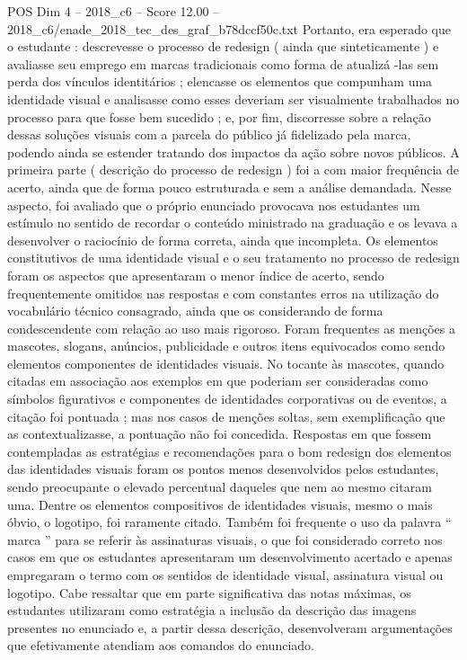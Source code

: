 \begin{textsample}{POS Dim 4 – 2018\_c6 – Score 12.00 – 2018\_c6/enade\_2018\_tec\_des\_graf\_b78dccf50c.txt}
Portanto, era esperado que o estudante : descrevesse o processo de redesign ( ainda que sinteticamente ) e avaliasse seu emprego em marcas tradicionais como forma de atualizá -las sem perda dos vínculos identitários ; elencasse os elementos que compunham uma identidade visual e analisasse como esses deveriam ser visualmente trabalhados no processo para que fosse bem sucedido ; e, por fim, discorresse sobre a relação dessas soluções visuais com a parcela do público já fidelizado pela marca, podendo ainda se estender tratando dos impactos da ação sobre novos públicos.
A primeira parte ( descrição do processo de redesign ) foi a com maior frequência de acerto, ainda que de forma pouco estruturada e sem a análise demandada.
Nesse aspecto, foi avaliado que o próprio enunciado provocava nos estudantes um estímulo no sentido de recordar o conteúdo ministrado na graduação e os levava a desenvolver o raciocínio de forma correta, ainda que incompleta.
Os elementos constitutivos de uma identidade visual e o seu tratamento no processo de redesign foram os aspectos que apresentaram o menor índice de acerto, sendo frequentemente omitidos nas respostas e com constantes erros na utilização do vocabulário técnico consagrado, ainda que os considerando de forma condescendente com relação ao uso mais rigoroso.
Foram frequentes as menções a mascotes, slogans, anúncios, publicidade e outros itens equivocados como sendo elementos componentes de identidades visuais.
No tocante às mascotes, quando citadas em associação aos exemplos em que poderiam ser consideradas como símbolos figurativos e componentes de identidades corporativas ou de eventos, a citação foi pontuada ; mas nos casos de menções soltas, sem exemplificação que as contextualizasse, a pontuação não foi concedida.
Respostas em que fossem contempladas as estratégias e recomendações para o bom redesign dos elementos das identidades visuais foram os pontos menos desenvolvidos pelos estudantes, sendo preocupante o elevado percentual daqueles que nem ao mesmo citaram uma.
Dentre os elementos compositivos de identidades visuais, mesmo o mais óbvio, o logotipo, foi raramente citado.
Também foi frequente o uso da palavra “ marca ” para se referir às assinaturas visuais, o que foi considerado correto nos casos em que os estudantes apresentaram um desenvolvimento acertado e apenas empregaram o termo com os sentidos de identidade visual, assinatura visual ou logotipo.
Cabe ressaltar que em parte significativa das notas máximas, os estudantes utilizaram como estratégia a inclusão da descrição das imagens presentes no enunciado e, a partir dessa descrição, desenvolveram argumentações que efetivamente atendiam aos comandos do enunciado.

\end{textsample}
